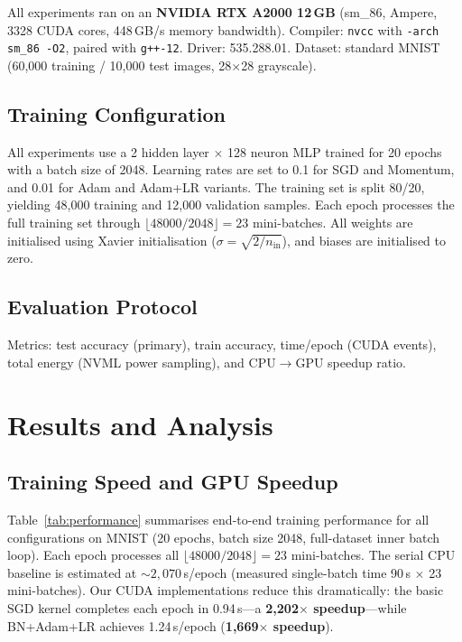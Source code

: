 \documentclass[conference]{IEEEtran}
\begin{document}
All experiments ran on an \textbf{NVIDIA RTX A2000 12\,GB} (sm\_86, Ampere, 3328 CUDA cores, 448\,GB/s memory bandwidth). Compiler: \texttt{nvcc} with \texttt{-arch sm\_86 -O2}, paired with \texttt{g++-12}. Driver: 535.288.01. Dataset: standard MNIST~\cite{b1} (60,000 training / 10,000 test images, 28$\times$28 grayscale).

\subsection{Training Configuration}

All experiments use a 2 hidden layer $\times$ 128 neuron MLP trained for 20 epochs with a batch size of 2048. Learning rates are set to 0.1 for SGD and Momentum, and 0.01 for Adam and Adam+LR variants. The training set is split 80/20, yielding 48,000 training and 12,000 validation samples. Each epoch processes the full training set through $\lfloor 48000/2048 \rfloor = 23$ mini-batches. All weights are initialised using Xavier initialisation ($\sigma = \sqrt{2/n_\text{in}}$), and biases are initialised to zero.

\subsection{Evaluation Protocol}

Metrics: test accuracy (primary), train accuracy, time/epoch (CUDA events), total energy (NVML power sampling), and CPU$\to$GPU speedup ratio.

\section{Results and Analysis}

\subsection{Training Speed and GPU Speedup}

Table~\ref{tab:performance} summarises end-to-end training performance for all configurations on MNIST (20 epochs, batch size 2048, full-dataset inner batch loop). Each epoch processes all $\lfloor 48000/2048 \rfloor = 23$ mini-batches. The serial CPU baseline is estimated at $\sim\!2{,}070$\,s/epoch (measured single-batch time 90\,s $\times$ 23 mini-batches). Our CUDA implementations reduce this dramatically: the basic SGD kernel completes each epoch in 0.94\,s—a \textbf{2{,}202$\times$ speedup}—while BN+Adam+LR achieves 1.24\,s/epoch (\textbf{1{,}669$\times$ speedup}).
\end{document}
